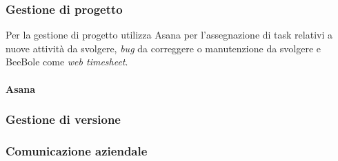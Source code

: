 \subsubsection{Gestione di progetto}
Per la gestione di progetto \azienda{} utilizza Asana per l'assegnazione di task relativi a nuove attività da svolgere, \emph{bug} da correggere o manutenzione da svolgere e BeeBole come \emph{web timesheet}.
\paragraph{Asana}
\subsubsection{Gestione di versione}
\subsubsection{Comunicazione aziendale}


